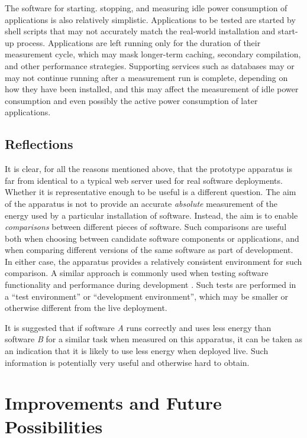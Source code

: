 The software for starting. stopping, and measuring idle power consumption of applications is also relatively simplistic. Applications to be tested are started by shell scripts that may not accurately match the real-world installation and start-up process. Applications are left running only for the duration of their measurement cycle, which may mask longer-term caching, secondary compilation, and other performance strategies. Supporting services such as databases may or may not continue running after a measurement run is complete, depending on how they have been installed, and this may affect the measurement of idle power consumption and even possibly the active power consumption of later applications.

\subsection{Reflections}

It is clear, for all the reasons mentioned above, that the prototype apparatus is far from identical to a typical web server used for real software deployments. Whether it is representative enough to be useful is a different question. The aim of the apparatus is not to provide an accurate \emph{absolute} measurement of the energy used by a particular installation of software. Instead, the aim is to enable \emph{comparisons} between different pieces of software. Such comparisons are useful both when choosing between candidate software components or applications, and when comparing different versions of the same software as part of development. In either case, the apparatus provides a relatively consistent environment for such comparison. A similar approach is commonly used when testing software functionality and performance during development \citep{Collins2012}. Such tests are performed in a \enquote{test environment} or \enquote{development environment}, which may be smaller or otherwise different from the live deployment.

It is suggested that if software \emph{A} runs correctly and uses less energy than software \emph{B} for a similar task when measured on this apparatus, it can be taken as an indication that it is likely to use less energy when deployed live. Such information is potentially very useful and otherwise hard to obtain.

\section{Improvements and Future Possibilities}
\label{testrig:improvements}

